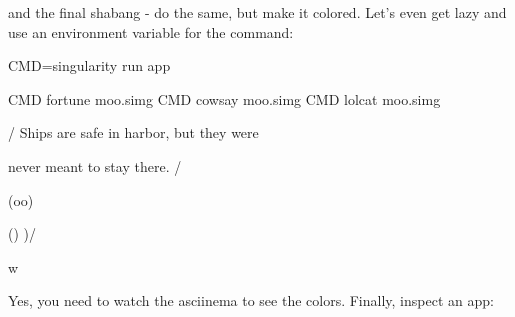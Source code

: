\documentclass[letterpaper,10pt,english]{sphinxmanual}
\begin{document}
and the final shabang - do the same, but make it colored. Let’s even get
lazy and use an environment variable for the command:

%
\begin{sphinxVerbatim}[commandchars=\\\{\}]
CMD=\PYGZdq{}singularity run \PYGZhy{}\PYGZhy{}app\PYGZdq{}

\PYGZdl{}CMD fortune moo.simg \textbar{} \PYGZdl{}CMD cowsay moo.simg \textbar{} \PYGZdl{}CMD lolcat moo.simg

 \PYGZus{}\PYGZus{}\PYGZus{}\PYGZus{}\PYGZus{}\PYGZus{}\PYGZus{}\PYGZus{}\PYGZus{}\PYGZus{}\PYGZus{}\PYGZus{}\PYGZus{}\PYGZus{}\PYGZus{}\PYGZus{}\PYGZus{}\PYGZus{}\PYGZus{}\PYGZus{}\PYGZus{}\PYGZus{}\PYGZus{}\PYGZus{}\PYGZus{}\PYGZus{}\PYGZus{}\PYGZus{}\PYGZus{}\PYGZus{}\PYGZus{}\PYGZus{}\PYGZus{}\PYGZus{}\PYGZus{}\PYGZus{}\PYGZus{}\PYGZus{}\PYGZus{}\PYGZus{}\PYGZus{}

/ Ships are safe in harbor, but they were \PYGZbs{}

\PYGZbs{} never meant to stay there.              /

 \PYGZhy{}\PYGZhy{}\PYGZhy{}\PYGZhy{}\PYGZhy{}\PYGZhy{}\PYGZhy{}\PYGZhy{}\PYGZhy{}\PYGZhy{}\PYGZhy{}\PYGZhy{}\PYGZhy{}\PYGZhy{}\PYGZhy{}\PYGZhy{}\PYGZhy{}\PYGZhy{}\PYGZhy{}\PYGZhy{}\PYGZhy{}\PYGZhy{}\PYGZhy{}\PYGZhy{}\PYGZhy{}\PYGZhy{}\PYGZhy{}\PYGZhy{}\PYGZhy{}\PYGZhy{}\PYGZhy{}\PYGZhy{}\PYGZhy{}\PYGZhy{}\PYGZhy{}\PYGZhy{}\PYGZhy{}\PYGZhy{}\PYGZhy{}\PYGZhy{}\PYGZhy{}

        \PYGZbs{}   \PYGZca{}\PYGZus{}\PYGZus{}\PYGZca{}

         \PYGZbs{}  (oo)\PYGZbs{}\PYGZus{}\PYGZus{}\PYGZus{}\PYGZus{}\PYGZus{}\PYGZus{}\PYGZus{}

            (\PYGZus{}\PYGZus{})\PYGZbs{}       )\PYGZbs{}/\PYGZbs{}

                \textbar{}\textbar{}\PYGZhy{}\PYGZhy{}\PYGZhy{}\PYGZhy{}w \textbar{}

                \textbar{}\textbar{}     \textbar{}\textbar{}
\end{sphinxVerbatim}

Yes, you need to watch the asciinema to see the colors. Finally, inspect
an app:

%
\begin{sphinxVerbatim}[commandchars=\\\{\}]
    


     

     

\end{sphinxVerbatim}
\end{document}
